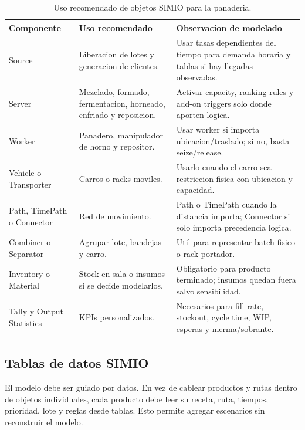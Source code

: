 \documentclass[12pt]{article}
\begin{document}
\begin{table}[H]
\centering
\caption{Uso recomendado de objetos SIMIO para la panaderia.}
\begin{tabularx}{\textwidth}{L{2.7cm}L{4.4cm}Y}
\toprule
{}
\color{white}Componente & \color{white}Uso recomendado & \color{white}Observacion de modelado \\
\midrule
Source & Liberacion de lotes y generacion de clientes. & Usar tasas dependientes del tiempo para demanda horaria y tablas si hay llegadas observadas. \\
Server & Mezclado, formado, fermentacion, horneado, enfriado y reposicion. & Activar capacity, ranking rules y add-on triggers solo donde aporten logica. \\
Worker & Panadero, manipulador de horno y repositor. & Usar worker si importa ubicacion/traslado; si no, basta seize/release. \\
Vehicle o Transporter & Carros o racks moviles. & Usarlo cuando el carro sea restriccion fisica con ubicacion y capacidad. \\
Path, TimePath o Connector & Red de movimiento. & Path o TimePath cuando la distancia importa; Connector si solo importa precedencia logica. \\
Combiner o Separator & Agrupar lote, bandejas y carro. & Util para representar batch fisico o rack portador. \\
Inventory o Material & Stock en sala o insumos si se decide modelarlos. & Obligatorio para producto terminado; insumos quedan fuera salvo sensibilidad. \\
Tally y Output Statistics & KPIs personalizados. & Necesarios para fill rate, stockout, cycle time, WIP, esperas y merma/sobrante. \\
\bottomrule
\end{tabularx}
\end{table}

\subsection{Tablas de datos SIMIO}

El modelo debe ser guiado por datos. En vez de cablear productos y rutas dentro de objetos individuales, cada producto debe leer su receta, ruta, tiempos, prioridad, lote y reglas desde tablas. Esto permite agregar escenarios sin reconstruir el modelo.
\end{document}

